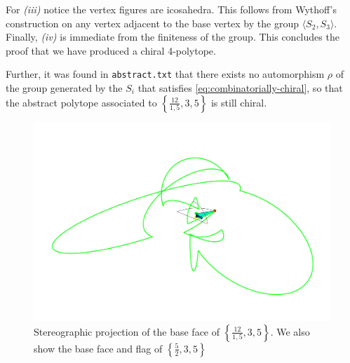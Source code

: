 \documentclass{article}
\theoremstyle{definition}
\begin{document}
	 For \textit{(iii)} notice the vertex figures are icosahedra. This follows from Wythoff's construction on any vertex adjacent to the base vertex by the group $\langle S_2,S_3\rangle$. Finally, \textit{(iv)} is immediate from the finiteness of the group. This concludes the proof that we have produced a chiral 4-polytope.
	
	Further, it was found in \texttt{abstract.txt} that there exists no automorphism $\rho$ of the group generated by the $S_i$ that satisfies \cref{eq:combinatorially-chiral}, so that the abstract polytope associated to $\left\{\frac{12}{1,5},3,5\right\}$ is still chiral.
	
	

\begin{figure}[H]
	\begin{center}
			\centering
			\includegraphics[width=1\linewidth]{fig12a}
	\end{center}
	\caption{Stereographic projection of the base face of  $\left\{\frac{12}{1,5},3,5\right\}$. We also show the base face and flag of $\left\{\frac{5}{2},3,5\right\}$}\label{fig:12}
\end{figure}
\end{document}
